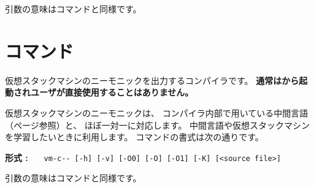 引数の意味は{\cmmc}コマンドと同様です。

\section{{\vcmmc}コマンド}
\label{command:vcmmc}

仮想スタックマシンのニーモニックを出力する{\cmm}コンパイラです。
{\bf 通常は{\cmv}から起動されユーザが直接使用することはありません。}

仮想スタックマシンのニーモニックは、
コンパイラ内部で用いている中間言語（\pageref{app:vm}ページ参照）と、
ほぼ一対一に対応します。
中間言語や仮想スタックマシンを学習したいときに利用します。
{\vcmmc}コマンドの書式は次の通りです。

\begin{flushleft}
{\bf 形式 : }~~~\verb/vm-c-- [-h] [-v] [-O0] [-O] [-O1] [-K] [<source file>]/
\end{flushleft}

引数の意味は{\cmmc}コマンドと同様です。
%

